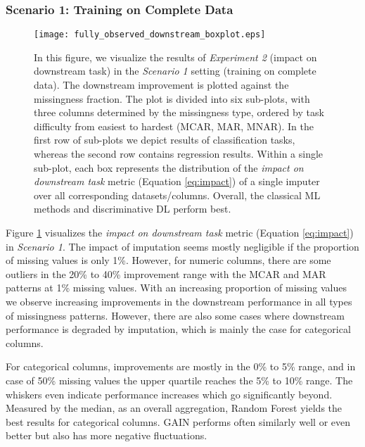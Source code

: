 \subsubsection{Scenario 1: Training on Complete Data}


\begin{figure}\centering
	\texttt{[image: fully\_observed\_downstream\_boxplot.eps]}

	\caption[Downstream Ranks - Fully Observed]{In this figure, we visualize the results of \textit{Experiment 2} (impact on downstream task) in the \textit{Scenario 1} setting (training on complete data). The downstream improvement is plotted against the missingness fraction. The plot is divided into six sub-plots, with three columns determined by the missingness type, ordered by task difficulty from easiest to hardest (MCAR, MAR, MNAR). In the first row of sub-plots we depict results of classification tasks, whereas the second row contains regression results. Within a single sub-plot, each box represents the distribution of the \textit{impact on downstream task} metric (Equation \ref{eq:impact}) of a single imputer over all corresponding datasets/columns. Overall, the classical ML methods and discriminative DL perform best.
    }
	\label{fig:fully_observed_downstream_boxplot}
\end{figure}

Figure \ref{fig:fully_observed_downstream_boxplot} visualizes the \textit{impact on downstream task} metric (Equation \ref{eq:impact}) in \textit{Scenario 1}. The impact of imputation seems mostly negligible if the proportion of missing values is only 1\%. However, for numeric columns, there are some outliers in the 20\% to 40\% improvement range with the MCAR and MAR patterns at 1\% missing values. With an increasing proportion of missing values we observe increasing improvements in the downstream performance in all types of missingness patterns. However, there are also some cases where downstream performance is degraded by imputation, which is mainly the case for categorical columns.

For categorical columns, improvements are mostly in the 0\% to 5\% range, and in case of 50\% missing values the upper quartile reaches the 5\% to 10\% range. The whiskers even indicate performance increases which go significantly beyond. Measured by the median, as an overall aggregation, Random Forest yields the best results for categorical columns. GAIN performs often similarly well or even better but also has more negative fluctuations.

